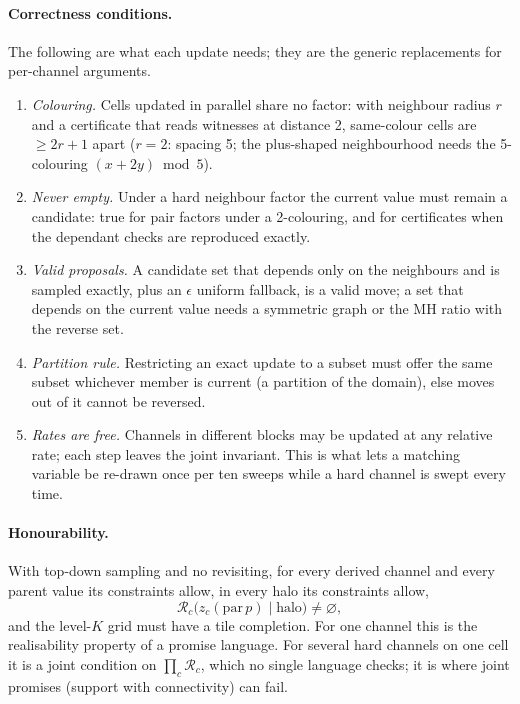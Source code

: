 \documentclass[11pt]{article}
\newcommand{\1}{\mathds{1}}
\newcommand{\refine}{\mathcal{R}}
\begin{document}
\paragraph{Correctness conditions.} The following are what each update needs; they
are the generic replacements for per-channel arguments.
\begin{enumerate}
  \item \emph{Colouring.} Cells updated in parallel share no factor: with neighbour
        radius $r$ and a certificate that reads witnesses at distance 2, same-colour
        cells are $\ge 2r+1$ apart ($r = 2$: spacing 5; the plus-shaped
        neighbourhood needs the 5-colouring $(x + 2y) \bmod 5$).
  \item \emph{Never empty.} Under a hard neighbour factor the current value must
        remain a candidate: true for pair factors under a 2-colouring, and for
        certificates when the dependant checks are reproduced exactly.
  \item \emph{Valid proposals.} A candidate set that depends only on the neighbours
        and is sampled exactly, plus an $\epsilon$ uniform fallback, is a valid
        move; a set that depends on the current value needs a symmetric graph or
        the MH ratio with the reverse set.
  \item \emph{Partition rule.} Restricting an exact update to a subset must offer the
        same subset whichever member is current (a partition of the domain), else
        moves out of it cannot be reversed.
  \item \emph{Rates are free.} Channels in different blocks may be updated at any
        relative rate; each step leaves the joint invariant. This is what lets a
        matching variable be re-drawn once per ten sweeps while a hard channel is
        swept every time.
\end{enumerate}

\paragraph{Honourability.} With top-down sampling and no revisiting, for every
derived channel and every parent value its constraints allow, in every halo its
constraints allow,
\[
  \refine_c\big(z_c(\mathrm{par}\,p) \mid \text{halo}\big) \neq \varnothing,
\]
and the level-$K$ grid must have a tile completion. For one channel this is the
realisability property of a promise language. For several hard channels on one
cell it is a joint condition on $\prod_c \refine_c$, which no single language
checks; it is where joint promises (support with connectivity) can fail.
\end{document}
